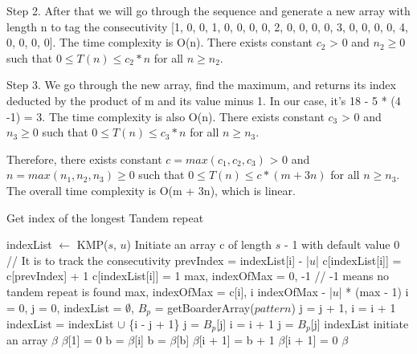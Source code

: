 \documentclass[11pt]{article}
\begin{document}
Step 2. After that we will go through the sequence and generate a new array with length n to tag the consecutivity [1, 0, 0, 1, 0, 0, 0, 0, 2, 0, 0, 0, 0, 3, 0, 0, 0, 0, 4, 0, 0, 0, 0]. The time complexity is O(n). There exists constant $c_2$ > 0 and $n_2 \ge 0 $ such that $ 0 \le T(n) \le c_2 * n $ for all $n \ge n_2$.

Step 3. We go through the new array, find the maximum, and returns its index deducted by the product of m and its value minus 1. In our case, it's 18 - 5 * (4 -1) = 3. The time complexity is also O(n). There exists constant $c_3$ > 0 and $n_3 \ge 0 $ such that $ 0 \le T(n) \le c_3 * n $ for all $n \ge n_3$.

Therefore,  there exists constant $c = max(c_1, c_2, c_3)$ > 0 and $n = max(n_1, n_2, n_3) \ge 0 $ such that $ 0 \le T(n) \le c * (m +3n) $ for all $n \ge n_3$. The overall time complexity is O(m + 3n), which is linear.  

\begin{algorithm}
\caption{Get index of the longest Tandem repeat}
\begin{algorithmic}[1]
\State indexList $\gets$ KMP($s$, $u$)
\State Initiate an array c of length $s$ - 1 with default value 0
\State // It is to track the consecutivity
	\State prevIndex = indexList[i] - |$u$|
		\State c[indexList[i]] = c[prevIndex] + 1
	\Else
		\State c[indexList[i]] = 1
	\EndIf
\EndFor
\State max, indexOfMax = 0, -1 // -1 means no tandem repeat is found
		\State max, indexOfMax = c[i], i
	\EndIf
\EndFor
\Return indexOfMax - |$u$| * (max - 1)
\EndProcedure
{}
\State i = 0, j = 0, indexList = $\emptyset$, $B_p$ = getBoarderArray($pattern$)
		\State j = j + 1, i = i + 1
	\EndIf
		\State indexList = indexList $\cup$ \{i - j + 1\}
		\State j = $B_p$[j]
	\Else
			\State i = i + 1
		\Else
			\State j = $B_p$[j]
		\EndIf
	\EndIf
\EndWhile
\Return indexList
\EndProcedure
{}
\State initiate an array $\beta$
\State $\beta$[1] = 0
	\State b = $\beta$[i]
		b = $\beta$[b]
	\EndWhile 
		\State  $\beta$[i + 1] = b + 1
	\Else
		\State$\beta$[i + 1] = 0
	\EndIf
\EndFor
\Return $\beta$
\EndProcedure
\end{algorithmic}
\end{algorithm}
\end{document}

